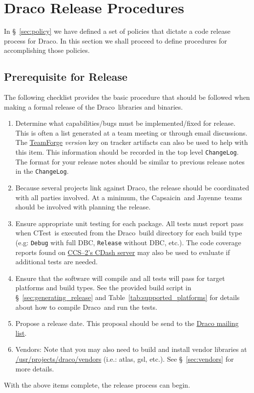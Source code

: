 \documentclass[note]{ResearchNote_pdf}
\newcommand{\draco}{{\normalfont\small\sffamily Draco}}
\newcommand{\jayenne}{{\normalfont\small\sffamily Jayenne}}
\newcommand{\capsaicin}{{\normalfont\small\sffamily Capsaicin}}
\newcommand{\ctest}{\textsf{CTest}}
\begin{document}

\section{Draco Release Procedures}
\label{sec:procedures}

In \S~\ref{sec:policy} we have defined a set of policies that dictate
a code release process for \draco.  In this section we shall proceed
to define procedures for accomplishing those policies.  


\subsection{Prerequisite for Release}
\label{sec:prereq}

The following checklist provides the basic procedure that should be
followed when making a formal release of the \draco\ libraries and
binaries.
\begin{enumerate}
\item Determine what capabilities/bugs must be implemented/fixed for
  release.  This is often a list generated at a team meeting or
  through email discussions. The
  \href{http://tf.lanl.gov/sf/projects/draco}{TeamForge} {\it version}
  key on tracker artifacts can also be used to help with this item.
  This information should be recorded in the top level
  \texttt{ChangeLog}.  The format for your release notes should be
  similar to previous release notes in the \texttt{ChangeLog}.
\item Because several projects link against \draco, the release should
  be coordinated with all parties involved.  At a minimum, the
  \capsaicin\ and \jayenne\ teams should be involved with planning the
  release.
\item Ensure appropriate unit testing for each package.  All tests
  must report pass when \ctest\ is executed from the \draco\ build
  directory for each build type (e.g: \texttt{Debug} with full DBC,
  \texttt{Release} without DBC, etc.). The code coverage reports found
  on \href{http://coder.lanl.gov/cdash}{CCS--2's CDash server} may
  also be used to evaluate if additional tests are needed.
\item Ensure that the software will compile and all tests will pass
  for target platforms and build types. See the provided build script
  in \S~\ref{sec:generating_release} and
  Table~\ref{tab:supported_platforms} for details about how to compile
  \draco\ and run the tests.
\item Propose a release date.  This proposal should be send to the
  \href{mailto:draco@lanl.gov}{Draco mailing list}. 
\item Vendors: Note that you may also need to build and install vendor libraries
  at \url{/usr/projects/draco/vendors} (i.e.: atlas, gsl, etc.).  See
  \S~\ref{sec:vendors} for more details. 
\end{enumerate}
With the above items complete, the release process can begin.
\end{document}
